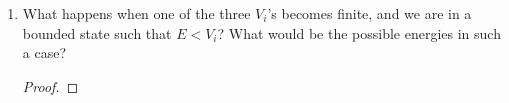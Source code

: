 \documentclass[../psets.tex]{subfiles}
\begin{document}
\begin{enumerate}
\begin{enumerate}
\begin{proof}
            \begin{equation*}
                E_{n_1} = \frac{\hbar^2\pi^2n_1^2}{2mL^2} = \frac{\hbar^2\pi^2n_1^2}{8ma^2}
            \end{equation*}
            Analogous results exist in the other two directions. Additionally, as in class on 2/12, setting all of our ODEs equal to constants in the separation of variables step \emph{also} gives us the equation
            \begin{equation*}
                E = E_{n_1}+E_{n_2}+E_{n_3}
            \end{equation*}
            Thus, the expression for the total energy of the system in terms of the energies associated with the propagation in the three space directions is
            \begin{equation*}
                \boxed{E_{n_1n_2n_3} = \frac{\hbar^2\pi^2}{8m}\left( \frac{n_1^2}{a^2}+\frac{n_2^2}{b^2}+\frac{n_3^2}{c^2} \right)}
            \end{equation*}
        \end{proof}
        \pagebreak
        \item What happens when one of the three $V_i$'s becomes finite, and we are in a bounded state such that $E<V_i$? What would be the possible energies in such a case?
        \begin{proof}



\end{proof}
\end{enumerate}
\end{enumerate}
\end{document}
